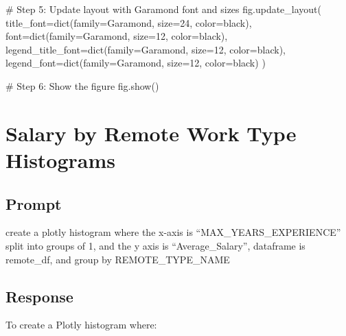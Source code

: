 \documentclass[
  letterpaper,
  DIV=11,
  numbers=noendperiod]{scrartcl}
\newenvironment{Shaded}{\begin{snugshade}}{\end{snugshade}}
\newcommand{\BuiltInTok}[1]{\textcolor[rgb]{0.00,0.23,0.31}{#1}}
\newcommand{\CommentTok}[1]{\textcolor[rgb]{0.37,0.37,0.37}{#1}}
\newcommand{\DecValTok}[1]{\textcolor[rgb]{0.68,0.00,0.00}{#1}}
\newcommand{\NormalTok}[1]{\textcolor[rgb]{0.00,0.23,0.31}{#1}}
\newcommand{\OperatorTok}[1]{\textcolor[rgb]{0.37,0.37,0.37}{#1}}
\newcommand{\StringTok}[1]{\textcolor[rgb]{0.13,0.47,0.30}{#1}}
\begin{document}
\begin{Shaded}
\begin{Highlighting}[]
\CommentTok{\# Step 5: Update layout with Garamond font and sizes}
\NormalTok{fig.update\_layout(}
\NormalTok{    title\_font}\OperatorTok{=}\BuiltInTok{dict}\NormalTok{(family}\OperatorTok{=}\StringTok{\textquotesingle{}Garamond\textquotesingle{}}\NormalTok{, size}\OperatorTok{=}\DecValTok{24}\NormalTok{, color}\OperatorTok{=}\StringTok{\textquotesingle{}black\textquotesingle{}}\NormalTok{),}
\NormalTok{    font}\OperatorTok{=}\BuiltInTok{dict}\NormalTok{(family}\OperatorTok{=}\StringTok{\textquotesingle{}Garamond\textquotesingle{}}\NormalTok{, size}\OperatorTok{=}\DecValTok{12}\NormalTok{, color}\OperatorTok{=}\StringTok{\textquotesingle{}black\textquotesingle{}}\NormalTok{),}
\NormalTok{    legend\_title\_font}\OperatorTok{=}\BuiltInTok{dict}\NormalTok{(family}\OperatorTok{=}\StringTok{\textquotesingle{}Garamond\textquotesingle{}}\NormalTok{, size}\OperatorTok{=}\DecValTok{12}\NormalTok{, color}\OperatorTok{=}\StringTok{\textquotesingle{}black\textquotesingle{}}\NormalTok{),}
\NormalTok{    legend\_font}\OperatorTok{=}\BuiltInTok{dict}\NormalTok{(family}\OperatorTok{=}\StringTok{\textquotesingle{}Garamond\textquotesingle{}}\NormalTok{, size}\OperatorTok{=}\DecValTok{12}\NormalTok{, color}\OperatorTok{=}\StringTok{\textquotesingle{}black\textquotesingle{}}\NormalTok{)}
\NormalTok{)}

\CommentTok{\# Step 6: Show the figure}
\NormalTok{fig.show()}
\end{Highlighting}
\end{Shaded}

\section{Salary by Remote Work Type
Histograms}\label{salary-by-remote-work-type-histograms}

\subsection{Prompt}\label{prompt-6}

create a plotly histogram where the x-axis is ``MAX\_YEARS\_EXPERIENCE''
split into groups of 1, and the y axis is ``Average\_Salary'', dataframe
is remote\_df, and group by REMOTE\_TYPE\_NAME

\subsection{Response}\label{response-6}

To create a Plotly histogram where:
\end{document}
